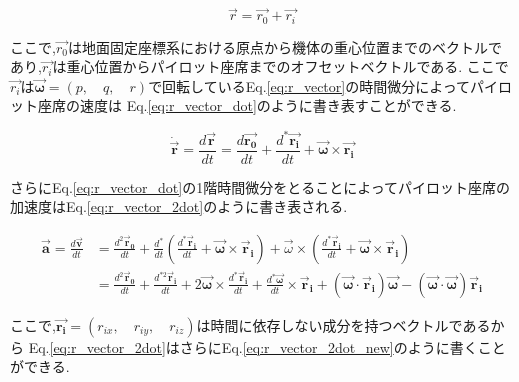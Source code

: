     \begin{equation}
    \vec{r}=\vec{r_0}+\vec{r_i}
    \label{eq:r_vector}
    \end{equation}

    ここで,$\vec{r_0}$は地面固定座標系における原点から機体の重心位置までのベクトルであり,$\vec{r_i}$は重心位置からパイロット座席までのオフセットベクトルである.
    ここで$\vec{r_i}$は$\vec{\boldsymbol{\omega}}=(p, \quad q, \quad r)$で回転しているEq.\eqref{eq:r_vector}の時間微分によってパイロット座席の速度は
    Eq.\eqref{eq:r_vector_dot}のように書き表すことができる.

    \begin{equation}
    \dot{\vec{\boldsymbol{r}}}=\frac{d \vec{\boldsymbol{r}}}{d t}=\frac{d \vec{\boldsymbol{r_0}}}{d t}+
    \frac{d^* \vec{\boldsymbol{r_i}}}{d t}+\vec{\boldsymbol{\omega}} \times \vec{\boldsymbol{r_i}}
    \label{eq:r_vector_dot}
    \end{equation}

    さらにEq.\eqref{eq:r_vector_dot}の1階時間微分をとることによってパイロット座席の加速度はEq.\eqref{eq:r_vector_2dot}のように書き表される.

    \begin{equation}
        \begin{aligned}
        \vec{\boldsymbol{a}}=\frac{d \vec{\boldsymbol{v}}}{d t} & =\frac{d^2 \vec{\boldsymbol{r}}_{\mathbf{0}}}{d t}+\frac{d^*}{d t}\left(\frac{d^* \vec{\boldsymbol{r}}_{\boldsymbol{i}}}{d t}+\vec{\boldsymbol{\omega}} \times \vec{\boldsymbol{r}}_{\boldsymbol{i}}\right)+\vec{\omega} \times\left(\frac{d^* \vec{\boldsymbol{r}}_{\boldsymbol{i}}}{d t}+\vec{\boldsymbol{\omega}} \times \vec{\boldsymbol{r}}_{\boldsymbol{i}}\right) \\
        & =\frac{d^2 \vec{\boldsymbol{r}}_{\mathbf{0}}}{d t}+\frac{d^{* 2} \vec{\boldsymbol{r}}_{\boldsymbol{i}}}{d t}+2 \vec{\boldsymbol{\omega}} \times \frac{d^* \vec{\boldsymbol{r}}_{\boldsymbol{i}}}{d t}+\frac{d^* \vec{\boldsymbol{\omega}}}{d t} \times \vec{\boldsymbol{r}}_{\boldsymbol{i}}+\left(\vec{\boldsymbol{\omega}} \cdot \vec{\boldsymbol{r}}_{\boldsymbol{i}}\right) \vec{\boldsymbol{\omega}}-(\vec{\boldsymbol{\omega}} \cdot \vec{\boldsymbol{\omega}}) \vec{\boldsymbol{r}}_{\boldsymbol{i}}
        \end{aligned}
        \label{eq:r_vector_2dot}
    \end{equation}

    ここで,$\vec{\boldsymbol{r_i}}=(r_{ix}, \quad r_{iy}, \quad r_{iz})$は時間に依存しない成分を持つベクトルであるから
    Eq.\eqref{eq:r_vector_2dot}はさらにEq.\eqref{eq:r_vector_2dot_new}のように書くことができる.

